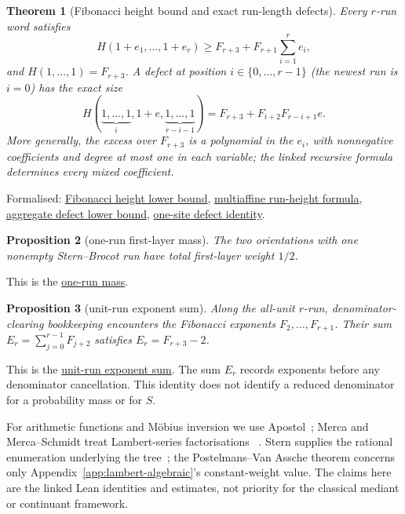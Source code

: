 \documentclass[11pt]{article}
\newcommand{\commit}{ebc98ee71f6819bd9fe344a0bb343542c604e533}
\newcommand{\repobase}{https://github.com/wcook04/plectis-lean-erdos249-257/blob/\commit}
\newcommand{\PK}{Erdos249257}
\newcommand{\lword}[4]{\href{\repobase/\PK/#1\#L#2}{#4}}
\newtheorem{theorem}{Theorem}[section]
\newtheorem{proposition}[theorem]{Proposition}
\theoremstyle{definition}
\theoremstyle{remark}
\begin{document}
{\begin{theorem}[Fibonacci height bound and exact run-length defects]
\label{res:sternbrocotruns}
Every \(r\)-run word satisfies
\[
 H(1+e_1,\ldots,1+e_r)
 \ge F_{r+3}+F_{r+1}\sum_{i=1}^r e_i,
\]
and \(H(1,\ldots,1)=F_{r+3}\).  A defect at position
\(i\in\{0,\ldots,r-1\}\) (the newest run is $i=0$) has the exact size
\[
 H(\underbrace{1,\ldots,1}_{i},1+e,
   \underbrace{1,\ldots,1}_{r-i-1})
 =F_{r+3}+F_{i+2}F_{r-i+1}e.
\]
More generally, the excess over $F_{r+3}$ is a polynomial in the $e_i$, with
nonnegative coefficients and degree at most one in each variable; the linked
recursive formula determines every mixed coefficient.
\end{theorem}
\noindent Formalised:
\lword{SternBrocotRunGeometry.lean}{185}{runHeight_fib_lower}{Fibonacci height lower bound},
\lword{SternBrocotRunGeometry.lean}{263}{runHeight_defectRunLengths}{multiaffine run-height formula},
\lword{SternBrocotRunGeometry.lean}{343}{runHeight_defect_fib_sum_lower}{aggregate defect lower bound},
\lword{SternBrocotRunGeometry.lean}{413}{runHeight_oneSiteDefect}{one-site defect identity}.

\begin{proposition}[one-run first-layer mass]\label{res:onerunmass}
The two orientations with one nonempty Stern--Brocot run have total
first-layer weight $1/2$.
\end{proposition}
\noindent This is the
\lword{SternBrocotRunGeometry.lean}{467}{oneRunMass_eq_half}{one-run mass}.

\begin{proposition}[unit-run exponent sum]\label{res:rundenominator}
Along the all-unit $r$-run, denominator-clearing bookkeeping encounters the
Fibonacci exponents $F_2,\ldots,F_{r+1}$.  Their sum
$E_r=\sum_{j=0}^{r-1}F_{j+2}$ satisfies \(E_r=F_{r+3}-2\).
\end{proposition}
\noindent This is the
\lword{SternBrocotRunGeometry.lean}{491}{naturalRunDenominatorExponent_add_two}{unit-run exponent sum}.
The sum $E_r$ records exponents before any denominator cancellation.  This
identity does not identify a reduced denominator for a probability mass or
for \(S\).

For arithmetic functions and M\"obius inversion we use Apostol~\cite{apostol};
Merca and Merca--Schmidt treat Lambert-series factorisations
~\cite{merca2017,mercaschmidt}.  Stern supplies the rational enumeration
underlying the tree~\cite{stern1858}; the Postelmans--Van Assche theorem
concerns only Appendix~\ref{app:lambert-algebraic}'s constant-weight value.
The claims here are the linked Lean identities and estimates, not priority for
the classical mediant or continuant framework.
}
\end{document}
